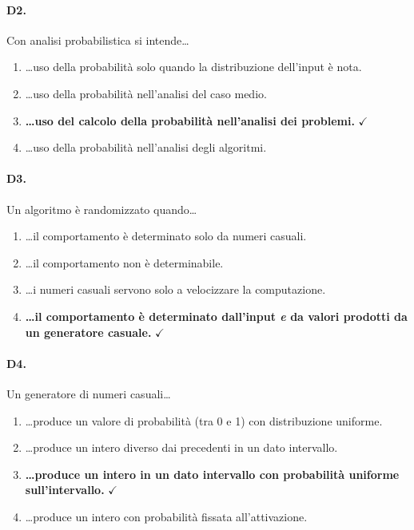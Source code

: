 \paragraph{D2.} Con analisi probabilistica si intende\ldots
\begin{enumerate}[label=\Alph*.,leftmargin=*]
	\item \ldots uso della probabilit\`a solo quando la distribuzione dell'input \`e nota.
	\item \ldots uso della probabilit\`a nell'analisi del caso medio.
	\item \textcolor{correctgreen}{\textbf{\ldots uso del calcolo della probabilit\`a nell'analisi dei problemi.}} \hfill\textcolor{correctgreen}{$\checkmark$}
	\item \ldots uso della probabilit\`a nell'analisi degli algoritmi.
\end{enumerate}

\paragraph{D3.} Un algoritmo \`e randomizzato quando\ldots
\begin{enumerate}[label=\Alph*.,leftmargin=*]
	\item \ldots il comportamento \`e determinato solo da numeri casuali.
	\item \ldots il comportamento non \`e determinabile.
	\item \ldots i numeri casuali servono solo a velocizzare la computazione.
	\item \textcolor{correctgreen}{\textbf{\ldots il comportamento \`e determinato dall'input \emph{e} da valori prodotti da un generatore casuale.}} \hfill\textcolor{correctgreen}{$\checkmark$}
\end{enumerate}

\paragraph{D4.} Un generatore di numeri casuali\ldots
\begin{enumerate}[label=\Alph*.,leftmargin=*]
	\item \ldots produce un valore di probabilit\`a (tra 0 e 1) con distribuzione uniforme.
	\item \ldots produce un intero diverso dai precedenti in un dato intervallo.
	\item \textcolor{correctgreen}{\textbf{\ldots produce un intero in un dato intervallo con probabilit\`a uniforme sull'intervallo.}} \hfill\textcolor{correctgreen}{$\checkmark$}
	\item \ldots produce un intero con probabilit\`a fissata all'attivazione.
\end{enumerate}

